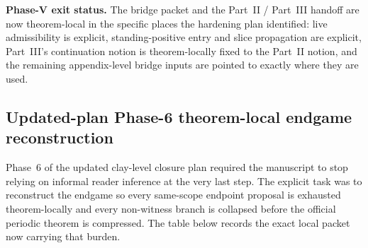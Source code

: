 \noindent\textbf{Phase-V exit status.} The bridge packet and the Part~II / Part~III handoff are now theorem-local in the specific places the hardening plan identified: live admissibility is explicit, standing-positive entry and slice propagation are explicit, Part~III's continuation notion is theorem-locally fixed to the Part~II notion, and the remaining appendix-level bridge inputs are pointed to exactly where they are used.

\subsection*{Updated-plan Phase-6 theorem-local endgame reconstruction}
Phase~6 of the updated clay-level closure plan required the manuscript to stop relying on informal reader inference at the very last step. The explicit task was to reconstruct the endgame so every same-scope endpoint proposal is exhausted theorem-locally and every non-witness branch is collapsed before the official periodic theorem is compressed. The table below records the exact local packet now carrying that burden.

